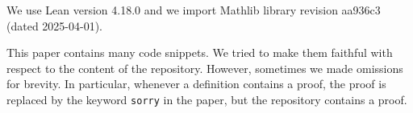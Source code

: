 We use Lean version 4.18.0 and we import Mathlib library revision aa936c3 (dated 2025-04-01).

This paper contains many code snippets.
We tried to make them faithful with respect to the content of the repository.
However, sometimes we made omissions for brevity.
In particular, whenever a definition contains a proof, the proof is replaced
by the keyword \texttt{sorry} in the paper, but the repository contains a proof.


